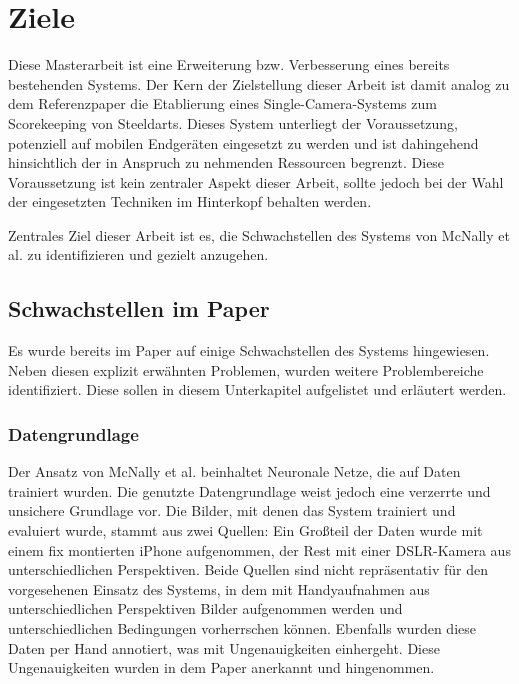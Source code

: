 \section{Ziele}
\label{sec:ziele}

Diese Masterarbeit ist eine Erweiterung bzw. Verbesserung eines bereits bestehenden Systems. Der Kern der Zielstellung dieser Arbeit ist damit analog zu dem Referenzpaper die Etablierung eines Single-Camera-Systems zum Scorekeeping von Steeldarts. Dieses System unterliegt der Voraussetzung, potenziell auf mobilen Endgeräten eingesetzt zu werden und ist dahingehend hinsichtlich der in Anspruch zu nehmenden Ressourcen begrenzt. Diese Voraussetzung ist kein zentraler Aspekt dieser Arbeit, sollte jedoch bei der Wahl der eingesetzten Techniken im Hinterkopf behalten werden.

Zentrales Ziel dieser Arbeit ist es, die Schwachstellen des Systems von McNally et al. zu identifizieren und gezielt anzugehen.

\subsection{Schwachstellen im Paper}
\label{sub:schwachstellen}

Es wurde bereits im Paper auf einige Schwachstellen des Systems hingewiesen. Neben diesen explizit erwähnten Problemen, wurden weitere Problembereiche identifiziert. Diese sollen in diesem Unterkapitel aufgelistet und erläutert werden.

\subsubsection{Datengrundlage}
\label{sec:ziele:schwachstellen:datengrundlage}

Der Ansatz von McNally et al. beinhaltet Neuronale Netze, die auf Daten trainiert wurden. Die genutzte Datengrundlage weist jedoch eine verzerrte und unsichere Grundlage vor. Die Bilder, mit denen das System trainiert und evaluiert wurde, stammt aus zwei Quellen: Ein Großteil der Daten wurde mit einem fix montierten iPhone aufgenommen, der Rest mit einer DSLR-Kamera aus unterschiedlichen Perspektiven. Beide Quellen sind nicht repräsentativ für den vorgesehenen Einsatz des Systems, in dem mit Handyaufnahmen aus unterschiedlichen Perspektiven Bilder aufgenommen werden und unterschiedlichen Bedingungen vorherrschen können. Ebenfalls wurden diese Daten per Hand annotiert, was mit Ungenauigkeiten einhergeht. Diese Ungenauigkeiten wurden in dem Paper anerkannt und hingenommen.

